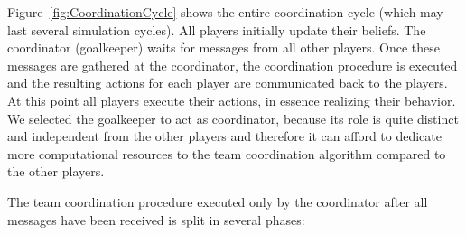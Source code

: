 Figure~\ref{fig:CoordinationCycle} shows the entire coordination cycle (which may last several simulation cycles). All players initially update their beliefs. The coordinator (goalkeeper) waits for messages from all other players. Once these messages are gathered at the coordinator, the coordination procedure is executed and the resulting actions for each player are communicated back to the players. At this point all players execute their actions, in essence realizing their behavior. We selected the goalkeeper to act as coordinator, because its role is quite distinct and independent from the other players and therefore it can afford to dedicate more computational resources to the team coordination algorithm compared to the other players. 

The team coordination procedure executed only by the coordinator after all messages have been received is split in several phases:
